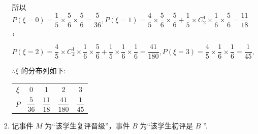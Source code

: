 \begin{enumerate}
\begin{enumerate}
\begin{jieda}
\begin{enumerate}
                所以 $P\left( {\xi  = 0}\right)  = \dfrac{1}{5} \times  \dfrac{5}{6} \times  \dfrac{5}{6} = \dfrac{5}{36},P\left( {\xi  = 1}\right)  = \dfrac{4}{5} \times  \dfrac{5}{6} \times  \dfrac{5}{6} + \dfrac{1}{5} \times  {{C}}_{2}^{1} \times  \dfrac{1}{6} \times  \dfrac{5}{6} = \dfrac{11}{18}$ ，
                
                $P\left( {\xi  = 2}\right)  = \dfrac{4}{5} \times  {{C}}_{2}^{1} \times  \dfrac{1}{6} \times  \dfrac{5}{6} + \dfrac{1}{5} \times  \dfrac{1}{6} \times  \dfrac{1}{6} = \dfrac{41}{180},P\left( {\xi  = 3}\right)  = \dfrac{4}{5} \times  \dfrac{1}{6} \times  \dfrac{1}{6} = \dfrac{1}{45},$
                
                $\therefore \xi$ 的分布列如下:
                
                \begin{center}
                
                \begin{tabular}{|c|c|c|c|c|}
                \hline
                $\xi$ & 0 & 1 & 2 & 3 \\
                \cline{1-5}
                $P$ & $\dfrac{5}{36}$ & $\dfrac{11}{18}$ & $\dfrac{41}{180}$ & $\dfrac{1}{45}$ \\
                \cline{1-5}
                \hline
                \end{tabular}
                
                \end{center}
                
                \item 记事件 $M$ 为“该学生复评晋级”，事件 $B$ 为“该学生初评是 $B$ ”.
                

\end{enumerate}
\end{jieda}
\end{enumerate}
\end{enumerate}
